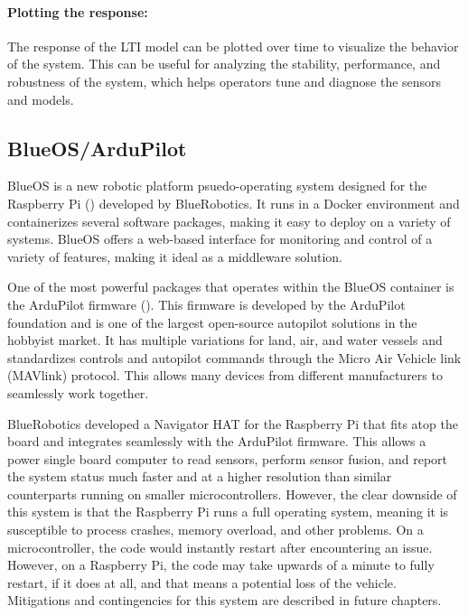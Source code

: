 \paragraph*{Plotting the response:} The response of the LTI model can be plotted over time to visualize the behavior of the system. 
This can be useful for analyzing the stability, performance, and robustness of the system, which helps operators tune and diagnose the sensors and models.

\subsection{BlueOS/ArduPilot}
BlueOS is a new robotic platform psuedo-operating system designed for the Raspberry Pi () developed by BlueRobotics.
It runs in a Docker environment and containerizes several software packages, making it easy to deploy on a variety of systems.
BlueOS offers a web-based interface for monitoring and control of a variety of features, making it ideal as a middleware solution.

One of the most powerful packages that operates within the BlueOS container is the ArduPilot firmware ().
This firmware is developed by the ArduPilot foundation and is one of the largest open-source autopilot solutions in the hobbyist market.
It has multiple variations for land, air, and water vessels and standardizes controls and autopilot commands through the Micro Air Vehicle link (MAVlink) protocol.
This allows many devices from different manufacturers to seamlessly work together.

BlueRobotics developed a Navigator HAT for the Raspberry Pi that fits atop the board and integrates seamlessly with the ArduPilot firmware.
This allows a power single board computer to read sensors, perform sensor fusion, and report the system status much faster and at a higher resolution than similar counterparts running on smaller microcontrollers.
However, the clear downside of this system is that the Raspberry Pi runs a full operating system, meaning it is susceptible to process crashes, memory overload, and other problems.
On a microcontroller, the code would instantly restart after encountering an issue.
However, on a Raspberry Pi, the code may take upwards of a minute to fully restart, if it does at all, and that means a potential loss of the vehicle.
Mitigations and contingencies for this system are described in future chapters.

